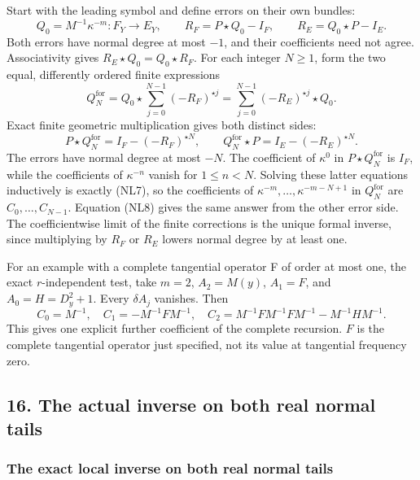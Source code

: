 \documentclass[
  11pt,
]{article}
\makeatletter
\let\ReaderOriginalAnchorStart\hyper@anchorstart
\let\ReaderOriginalAnchorEnd\hyper@anchorend
\let\ReaderPendingAliases\@empty
\def\ReaderArmAliases#1{\gdef\ReaderPendingAliases{#1}}
\def\hyper@anchorstart#1{\ReaderIfNativeAnchorTF{#1}{\ReaderPendingAliases\global\let\ReaderPendingAliases\@empty}{}\ReaderOriginalAnchorStart{#1}}
\makeatother
\begin{document}
Start with the leading symbol and define errors on their own bundles: \[
 Q_0=M^{-1}\kappa^{-m}:F_Y\to E_Y,\qquad
 R_F=P\star Q_0-I_F,\qquad R_E=Q_0\star P-I_E .
 \tag{NL11}
\] Both errors have normal degree at most \(-1\), and their coefficients
need not agree. Associativity gives \(R_E\star Q_0=Q_0\star R_F\). For
each integer \(N\geq1\), form the two equal, differently ordered finite
expressions \[
 Q_N^{\mathrm{for}}
 =Q_0\star\sum_{j=0}^{N-1}(-R_F)^{\star j}
 =\sum_{j=0}^{N-1}(-R_E)^{\star j}\star Q_0.
 \tag{NL12}
\] Exact finite geometric multiplication gives both distinct sides: \[
 P\star Q_N^{\mathrm{for}}=I_F-(-R_F)^{\star N},
 \qquad
 Q_N^{\mathrm{for}}\star P=I_E-(-R_E)^{\star N}.
 \tag{NL13}
\] The errors have normal degree at most \(-N\). The coefficient of
\(\kappa^0\) in \(P\star Q_N^{\mathrm{for}}\) is \(I_F\), while the
coefficients of \(\kappa^{-n}\) vanish for \(1\leq n<N\). Solving these
latter equations inductively is exactly (NL7), so the coefficients of
\(\kappa^{-m},\ldots,\kappa^{-m-N+1}\) in \(Q_N^{\mathrm{for}}\) are
\(C_0,\ldots,C_{N-1}\). Equation (NL8) gives the same answer from the
other error side. The coefficientwise limit of the finite corrections is
the unique formal inverse, since multiplying by \(R_F\) or \(R_E\)
lowers normal degree by at least one.

For an example with a complete tangential operator F of order at most
one, the exact \(r\)-independent test, take \(m=2\), \(A_2=M(y)\),
\(A_1=F\), and \(A_0=H=D_y^2+1\). Every \(\delta A_j\) vanishes. Then \[
 C_0=M^{-1},\quad
 C_1=-M^{-1}FM^{-1},\quad
 C_2=M^{-1}FM^{-1}FM^{-1}-M^{-1}HM^{-1}.
 \tag{NL14}
\] This gives one explicit further coefficient of the complete
recursion. \(F\) is the complete tangential operator just specified, not
its value at tangential frequency zero.

\ReaderArmAliases{\ReaderOriginalAnchorStart{AN03-GCF-FOUNDATION-016}\ReaderOriginalAnchorEnd\begingroup\expandafter\def\csname @currentHref\endcsname{AN03-GCF-FOUNDATION-016}\label{AN03-GCF-FOUNDATION-016}\endgroup\ReaderOriginalAnchorStart{boundary-foundation-16}\ReaderOriginalAnchorEnd}
\subsection{16. The actual inverse on both real normal
tails}\label{boundary-foundation-16}

\subsubsection{The exact local inverse on both real normal
tails}\label{the-exact-local-inverse-on-both-real-normal-tails}
\end{document}
